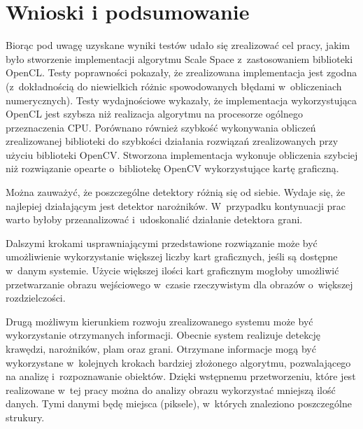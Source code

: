 \chapter{Wnioski i podsumowanie}
\label{cha:podsumowanie}

Biorąc pod uwagę uzyskane wyniki testów udało się zrealizować cel pracy, jakim było stworzenie implementacji algorytmu Scale Space z~zastosowaniem biblioteki OpenCL. Testy poprawności pokazały, że zrealizowana implementacja jest zgodna (z~dokładnością do niewielkich różnic spowodowanych błędami w~obliczeniach numerycznych). Testy wydajnościowe wykazały, że implementacja wykorzystująca OpenCL jest szybsza niż realizacja algorytmu na procesorze ogólnego przeznaczenia CPU. Porównano również szybkość wykonywania obliczeń zrealizowanej biblioteki do szybkości działania rozwiązań zrealizowanych przy użyciu biblioteki OpenCV. Stworzona implementacja wykonuje obliczenia szybciej niż rozwiązanie opearte o~bibliotekę OpenCV wykorzystujące kartę graficzną.

Można zauważyć, że poszczególne detektory różnią się od siebie. Wydaje się, że najlepiej działającym jest detektor narożników. W~przypadku kontynuacji prac warto byłoby przeanalizować i~udoskonalić działanie detektora grani.

Dalszymi krokami usprawniającymi przedstawione rozwiązanie może być umożliwienie wykorzystanie większej liczby kart graficznych, jeśli są dostępne w~danym systemie. Użycie większej ilości kart graficznym mogłoby umożliwić przetwarzanie obrazu wejściowego w~czasie rzeczywistym dla obrazów o~większej rozdzielczości.

Drugą możliwym kierunkiem rozwoju zrealizowanego systemu może być wykorzystanie otrzymanych informacji. Obecnie system realizuje detekcję krawędzi, narożników, plam oraz grani. Otrzymane informacje mogą być wykorzystane w~kolejnych krokach bardziej złożonego algorytmu, pozwalającego na analizę i~rozpoznawanie obiektów. Dzięki wstępnemu przetworzeniu, które jest realizowane w~tej pracy można do analizy obrazu wykorzystać mniejszą ilość danych. Tymi danymi będę miejsca (piksele), w~których znaleziono poszczególne strukury.
